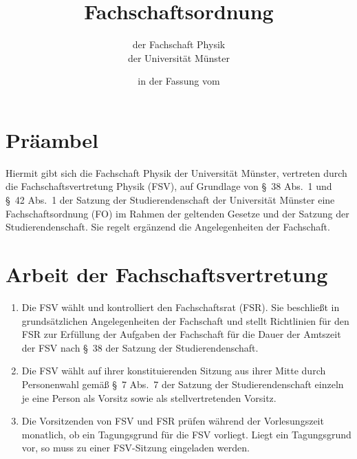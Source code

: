 
\usepackage{pdfpages}


\pagestyle{scrheadings}

\title{Fachschaftsordnung}
\subtitle{der Fachschaft Physik\\
der Universität Münster}
\date{in der Fassung vom }
\author{}



\maketitle

\section{Präambel}
Hiermit gibt sich die Fachschaft Physik der Universität Münster, vertreten durch die Fachschaftsvertretung Physik (FSV), auf Grundlage von §~38 Abs.~1 und §~42 Abs.~1 der Satzung der Studierendenschaft der Universität Münster eine Fachschaftsordnung (FO) im Rahmen der geltenden Gesetze und der Satzung der Studierendenschaft.
Sie regelt ergänzend die Angelegenheiten der Fachschaft.

\section{Arbeit der Fachschaftsvertretung}
\begin{enumerate}
	\item Die FSV wählt und kontrolliert den Fachschaftsrat (FSR). Sie beschließt in grundsätzlichen Angelegenheiten der Fachschaft und stellt Richtlinien für den FSR zur Erfüllung der Aufgaben der Fachschaft für die Dauer	der Amtszeit der FSV nach §~38 der Satzung der Studierendenschaft.
	\item Die FSV wählt auf ihrer konstituierenden Sitzung aus ihrer Mitte durch Personenwahl gemäß §~7 Abs.~7 der Satzung der Studierendenschaft einzeln je eine Person als Vorsitz sowie als stellvertretenden Vorsitz.
	\item Die Vorsitzenden von FSV und FSR prüfen während der Vorlesungszeit monatlich, ob ein Tagungsgrund für die FSV vorliegt. Liegt ein Tagungsgrund vor, so muss zu einer FSV-Sitzung eingeladen werden.
\end{enumerate}

